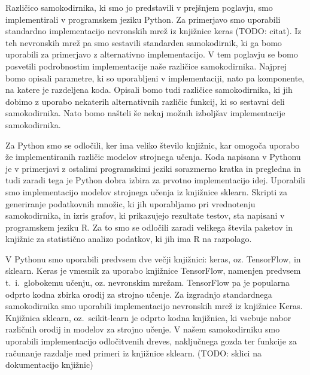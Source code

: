 \documentclass[12pt,a4paper]{article}
\begin{document}
Različico samokodirnika, ki smo jo predstavili v prejšnjem poglavju, smo implementirali v programskem jeziku Python.
Za primerjavo smo uporabili standardno implementacijo nevronskih mrež iz knjižnice keras (TODO: citat). %
Iz teh nevronskih mrež pa smo sestavili standarden samokodirnik, ki ga bomo uporabili za primerjavo z alternativno implementacijo.
V tem poglavju se bomo posvetili podrobnostim implementacije naše različice samokodirnika.
Najprej bomo opisali parametre, ki so uporabljeni v implementaciji, nato pa komponente, na katere je razdeljena koda.
Opisali bomo tudi različice samokodirnika, ki jih dobimo z uporabo nekaterih alternativnih različic funkcij, ki so sestavni deli samokodirnika.
Nato bomo našteli še nekaj možnih izboljšav implementacije samokodirnika.

Za Python smo se odločili, ker ima veliko število knjižnic, kar omogoča uporabo že implementiranih različic modelov strojnega učenja.
Koda napisana v Pythonu je v primerjavi z ostalimi programskimi jeziki sorazmerno kratka in pregledna in tudi zaradi tega je Python dobra izbira za prvotno implementacijo idej.
Uporabili smo implementacijo modelov strojnega učenja iz knjižnice sklearn.
Skripti za generiranje podatkovnih množic, ki jih uporabljamo pri vrednotenju samokodirnika, in izris grafov, ki prikazujejo rezultate testov, sta napisani v programskem jeziku R.
Za to smo se odločili zaradi velikega števila paketov in knjižnic za statistično analizo podatkov, ki jih ima R na razpolago.

V Pythonu smo uporabili predvsem dve večji knjižnici: keras, oz. TensorFlow, in sklearn.
Keras je vmesnik za uporabo knjižnice TensorFlow, namenjen predvsem t.~i.\ globokemu učenju, oz. nevronskim mrežam. 
TensorFlow pa je popularna odprto kodna zbirka orodij za strojno učenje.
Za izgradnjo standardnega samokodirnika smo uporabili implementacijo nevronskih mrež iz knjižnice Keras.
Knjižnica sklearn, oz.\ scikit-learn je odprto kodna knjižnica, ki vsebuje nabor različnih orodij in modelov za strojno učenje.
V našem samokodirniku smo uporabili implementacijo odločitvenih dreves, naključnega gozda ter funkcije za računanje razdalje med primeri iz knjižnice sklearn.
(TODO: sklici na dokumentacijo knjižnic)
\end{document}
